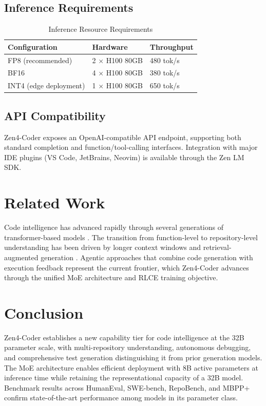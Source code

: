 \documentclass[11pt,a4paper]{article}
\begin{document}
\subsection{Inference Requirements}

\begin{table}[H]
\centering
\caption{Inference Resource Requirements}
\begin{tabular}{lll}
\toprule
\textbf{Configuration} & \textbf{Hardware} & \textbf{Throughput} \\
\midrule
FP8 (recommended) & 2 $\times$ H100 80GB & 480 tok/s \\
BF16 & 4 $\times$ H100 80GB & 380 tok/s \\
INT4 (edge deployment) & 1 $\times$ H100 80GB & 650 tok/s \\
\bottomrule
\end{tabular}
\end{table}

\subsection{API Compatibility}

Zen4-Coder exposes an OpenAI-compatible API endpoint, supporting both standard completion and function/tool-calling interfaces. Integration with major IDE plugins (VS Code, JetBrains, Neovim) is available through the Zen LM SDK.

\section{Related Work}

Code intelligence has advanced rapidly through several generations of transformer-based models \cite{codex,alphacode,starcoder,codellama}. The transition from function-level to repository-level understanding has been driven by longer context windows and retrieval-augmented generation \cite{repocoder,swebench}. Agentic approaches that combine code generation with execution feedback \cite{agentless,swebenchagent} represent the current frontier, which Zen4-Coder advances through the unified MoE architecture and RLCE training objective.

\section{Conclusion}

Zen4-Coder establishes a new capability tier for code intelligence at the 32B parameter scale, with multi-repository understanding, autonomous debugging, and comprehensive test generation distinguishing it from prior generation models. The MoE architecture enables efficient deployment with 8B active parameters at inference time while retaining the representational capacity of a 32B model. Benchmark results across HumanEval, SWE-bench, RepoBench, and MBPP+ confirm state-of-the-art performance among models in its parameter class.
\end{document}
